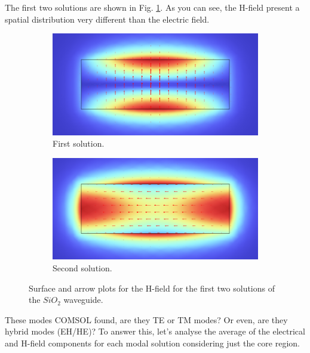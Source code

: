 \documentclass[a4paper,12pt]{article}
\begin{document}
The first two solutions are shown in Fig. \ref{fig:H_field}. As you can see, the H-field present a spatial distribution very different than the electric field.
            
\begin{figure}[H]
    \centering
    \begin{subfigure}{0.45\textwidth}
        \centering
        \includegraphics[scale=0.32]{SiO2_normH_1.png}
        \caption{First solution.}
    \end{subfigure}
    \hfill
    \begin{subfigure}{0.45\textwidth}
        \centering
        \includegraphics[scale=0.32]{SiO2_normH_2.png}
        \caption{Second solution.}
    \end{subfigure}
    \caption{Surface and arrow plots for the H-field for the first two solutions of the $SiO_2$ waveguide.}
    \label{fig:H_field}
\end{figure}

These modes COMSOL found, are they TE or TM modes? Or even, are they hybrid modes (EH/HE)? To answer this, let's analyse the average of the electrical and H-field components for each modal solution considering just the core region.
\end{document}
